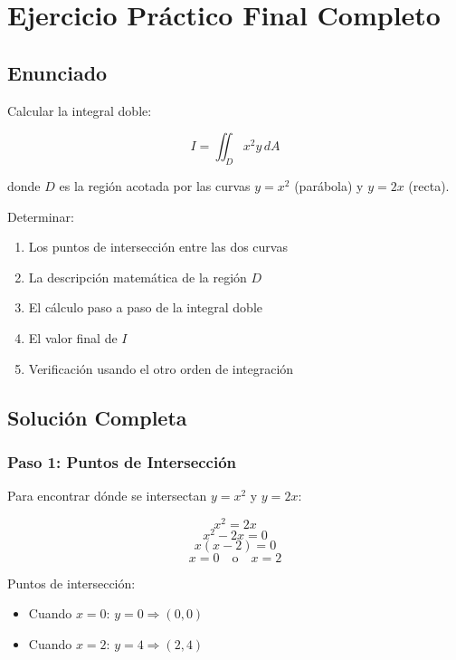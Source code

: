 \documentclass[12pt, a4paper]{book}
\begin{document}
\chapter{Ejercicio Práctico Final Completo}

\section{Enunciado}

\begin{tcolorbox}[colback=yellow!10!white, colframe=orange!75!black, title=Ejercicio Práctico Final]

Calcular la integral doble:

\[
I = \iint_D x^2 y \, dA
\]

donde $D$ es la región acotada por las curvas $y = x^2$ (parábola) y $y = 2x$ (recta).

Determinar:
\begin{enumerate}
    \item Los puntos de intersección entre las dos curvas
    \item La descripción matemática de la región $D$
    \item El cálculo paso a paso de la integral doble
    \item El valor final de $I$
    \item Verificación usando el otro orden de integración
\end{enumerate}

\end{tcolorbox}

\section{Solución Completa}

\subsection{Paso 1: Puntos de Intersección}

Para encontrar dónde se intersectan $y = x^2$ y $y = 2x$:

\[
x^2 = 2x
\]
\[
x^2 - 2x = 0
\]
\[
x(x - 2) = 0
\]
\[
x = 0 \quad \text{o} \quad x = 2
\]

Puntos de intersección:
\begin{itemize}
    \item Cuando $x = 0$: $y = 0 \Rightarrow (0,0)$
    \item Cuando $x = 2$: $y = 4 \Rightarrow (2,4)$
\end{itemize}
\end{document}

